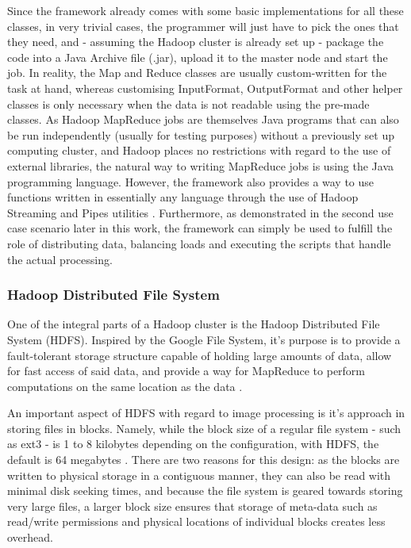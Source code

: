 \documentclass [12pt,a4paper]{report}
\begin{document}
Since the framework already comes with some basic implementations for all these classes, in very trivial cases, the programmer will just have to pick the ones that they need, and - assuming the Hadoop cluster is already set up - package the code into a Java Archive file (.jar), upload it to the master node and start the job. In reality, the Map and Reduce classes are usually custom-written for the task at hand, whereas customising InputFormat, OutputFormat and other helper classes is only necessary when the data is not readable using the pre-made classes. As Hadoop MapReduce jobs are themselves Java programs that can also be run independently (usually for testing purposes) without a previously set up computing cluster, and Hadoop places no restrictions with regard to the use of external libraries, the natural way to writing MapReduce jobs is using the Java programming language. However, the framework also provides a way to use functions written in essentially any language through the use of Hadoop Streaming and Pipes utilities \cite{hadoopstreaming,hadooppipes}. Furthermore, as demonstrated in the second use case scenario later in this work, the framework can simply be used to fulfill the role of distributing data, balancing loads and executing the scripts that handle the actual processing.

\subsubsection{Hadoop Distributed File System}
\label{hdfs}
One of the integral parts of a Hadoop cluster is the Hadoop Distributed File System (HDFS). Inspired by the Google File System, it's purpose is to provide a fault-tolerant storage structure capable of holding large amounts of data, allow for fast access of said data, and provide a way for MapReduce to perform computations on the same location as the data \cite{ghemawat2003google,borthakur2007hadoop}. 

An important aspect of HDFS with regard to image processing is it's approach in storing files in blocks. Namely, while the block size of a regular file system - such as ext3 - is 1 to 8 kilobytes depending on the configuration, with HDFS, the default is 64 megabytes \cite{ext3}. There are two reasons for this design: as the blocks are written to physical storage in a contiguous manner, they can also be read with minimal disk seeking times, and because the file system is geared towards storing very large files, a larger block size ensures that storage of meta-data such as read/write permissions and physical locations of individual blocks creates less overhead. 
\end{document}
